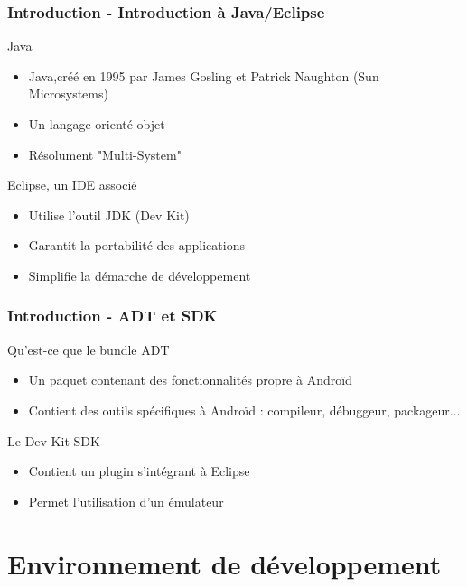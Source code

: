 \documentclass{beamer}
\begin{document}
\begin{frame}
  \frametitle{Introduction - Introduction à Java/Eclipse}
   \begin{block}{Java}
    \begin{itemize}
        \item Java,créé en 1995 par James Gosling et Patrick Naughton (Sun Microsystems)
        \item Un langage orienté objet
        \item Résolument "Multi-System"
    \end{itemize}
  \end{block}
  \pause
  \begin{block}{Eclipse, un IDE associé}
    \begin{itemize}
      \item Utilise l'outil JDK (Dev Kit)
      \item Garantit la portabilité des applications
      \item Simplifie la démarche de développement
    \end{itemize}
  \end{block}
\end{frame}



\begin{frame}
  \frametitle{Introduction - ADT et SDK}
    \begin{block}{Qu'est-ce que le bundle ADT}
    \begin{itemize}
        \item Un paquet contenant des fonctionnalités propre à Androïd
        \item Contient des outils spécifiques à Androïd : compileur, débuggeur, packageur...
    \end{itemize}
  \end{block}
  \pause
  \begin{block}{Le Dev Kit SDK}
    \begin{itemize}
      \item Contient un plugin s'intégrant à Eclipse
      \item Permet l'utilisation d'un émulateur
    \end{itemize}
  \end{block}
\end{frame}




\section{Environnement de développement}
\end{document}
